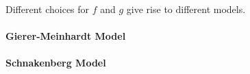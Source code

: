 

\medskip
Different choices for $f$ and $g$ give rise to different models.


\paragraph{Gierer-Meinhardt Model}







\paragraph{Schnakenberg Model}









